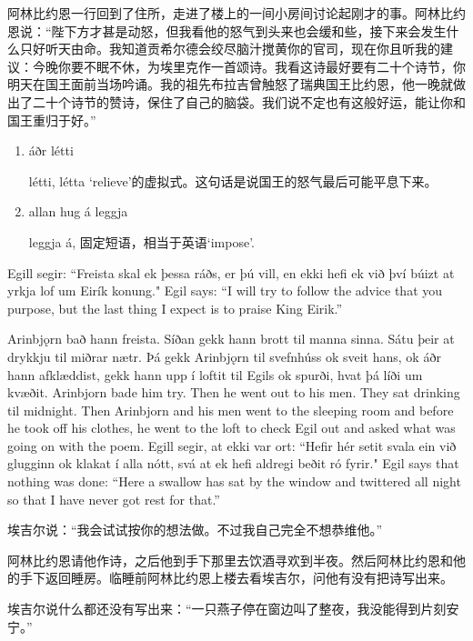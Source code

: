 \begin{translation*}{}
    阿林比约恩一行回到了住所，走进了楼上的一间小房间讨论起刚才的事。阿林比约恩说：“陛下方才甚是动怒，但我看他的怒气到头来也会缓和些，接下来会发生什么只好听天由命。我知道贡希尔德会绞尽脑汁搅黄你的官司，现在你且听我的建议：今晚你要不眠不休，为埃里克作一首颂诗。我看这诗最好要有二十个诗节，你明天在国王面前当场吟诵。我的祖先布拉吉曾触怒了瑞典国王比约恩，他一晚就做出了二十个诗节的赞诗，保住了自己的脑袋。我们说不定也有这般好运，能让你和国王重归于好。”
\end{translation*}
\begin{grammar*}{}
    \begin{enumerate}[leftmargin=*]
        \item áðr létti

              létti, létta `relieve'的虚拟式。这句话是说国王的怒气最后可能平息下来。
        \item allan hug á leggja

              leggja á, 固定短语，相当于英语`impose'.
    \end{enumerate}
\end{grammar*}
\begin{paracol}{2}
    Egill segir: ``Freista skal ek þessa ráðs, er þú vill, en ekki hefi ek við því búizt at yrkja lof um Eirík konung."
    \switchcolumn
    Egil says: ``I will try to follow the advice that you purpose, but the last thing I expect is to praise King Eirik.''

    \switchcolumn*
    Arinbjǫrn bað hann freista. Síðan gekk hann brott til manna sinna. Sátu þeir at drykkju til miðrar nætr. Þá gekk Arinbjǫrn til svefnhúss ok sveit hans, ok áðr hann afklæddist, gekk hann upp í loftit til Egils ok spurði, hvat þá líði um kvæðit.
    \switchcolumn
    Arinbjorn bade him try. Then he went out to his men. They sat drinking til midnight. Then Arinbjorn and his men went to the sleeping room and before he took off his clothes, he went to the loft to check Egil out and asked what was going on with the poem.
    \switchcolumn*
    Egill segir, at ekki var ort: ``Hefir hér setit svala ein við glugginn ok klakat í alla nótt, svá at ek hefi aldregi beðit ró fyrir."
    \switchcolumn
    Egil says that nothing was done: ``Here a swallow has sat by the window and twittered all night so that I have never got rest for that.''

\end{paracol}
\begin{translation*}{}
    埃吉尔说：“我会试试按你的想法做。不过我自己完全不想恭维他。”

    阿林比约恩请他作诗，之后他到手下那里去饮酒寻欢到半夜。然后阿林比约恩和他的手下返回睡房。临睡前阿林比约恩上楼去看埃吉尔，问他有没有把诗写出来。

    埃吉尔说什么都还没有写出来：“一只燕子停在窗边叫了整夜，我没能得到片刻安宁。”

\end{translation*}
